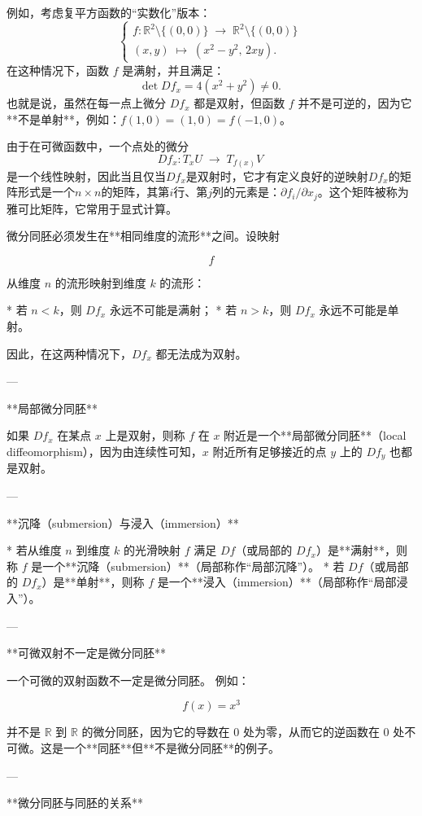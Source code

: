 例如，考虑复平方函数的“实数化”版本：
  $$
  \begin{cases}
  f:\mathbb{R}^2 \setminus \{(0,0)\} \;\to\; \mathbb{R}^2 \setminus \{(0,0)\}\\
  (x,y) \;\mapsto\; (x^2 - y^2,\, 2xy).
  \end{cases}~
  $$
在这种情况下，函数 $f$ 是满射，并且满足：
  $$
  \det Df_x = 4(x^2 + y^2) \neq 0.~
  $$
也就是说，虽然在每一点上微分 $Df_x$ 都是双射，但函数 $f$ 并不是可逆的，因为它**不是单射**，例如：$f(1,0) = (1,0) = f(-1,0)$。

由于在可微函数中，一个点处的微分
  $$
  Df_x: T_xU \;\to\; T_{f(x)}V~
  $$
是一个线性映射，因此当且仅当$Df_x$是双射时，它才有定义良好的逆映射$Df_x$的矩阵形式是一个$n \times n$的矩阵，其第$i$行、第$j$列的元素是：$\partial f_i/\partial x_j$。这个矩阵被称为雅可比矩阵，它常用于显式计算。

微分同胚必须发生在**相同维度的流形**之间。设映射

$$
f
$$

从维度 $n$ 的流形映射到维度 $k$ 的流形：

* 若 $n < k$，则 $Df_x$ 永远不可能是满射；
* 若 $n > k$，则 $Df_x$ 永远不可能是单射。

因此，在这两种情况下，$Df_x$ 都无法成为双射。

---

**局部微分同胚**

如果 $Df_x$ 在某点 $x$ 上是双射，则称 $f$ 在 $x$ 附近是一个**局部微分同胚**（local diffeomorphism），因为由连续性可知，$x$ 附近所有足够接近的点 $y$ 上的 $Df_y$ 也都是双射。

---

**沉降（submersion）与浸入（immersion）**

* 若从维度 $n$ 到维度 $k$ 的光滑映射 $f$ 满足 $Df$（或局部的 $Df_x$）是**满射**，则称 $f$ 是一个**沉降（submersion）**（局部称作“局部沉降”）。
* 若 $Df$（或局部的 $Df_x$）是**单射**，则称 $f$ 是一个**浸入（immersion）**（局部称作“局部浸入”）。

---

**可微双射不一定是微分同胚**

一个可微的双射函数不一定是微分同胚。
例如：

$$
f(x) = x^3
$$

并不是 $\mathbb{R}$ 到 $\mathbb{R}$ 的微分同胚，因为它的导数在 $0$ 处为零，从而它的逆函数在 $0$ 处不可微。这是一个**同胚**但**不是微分同胚**的例子。

---

**微分同胚与同胚的关系**

